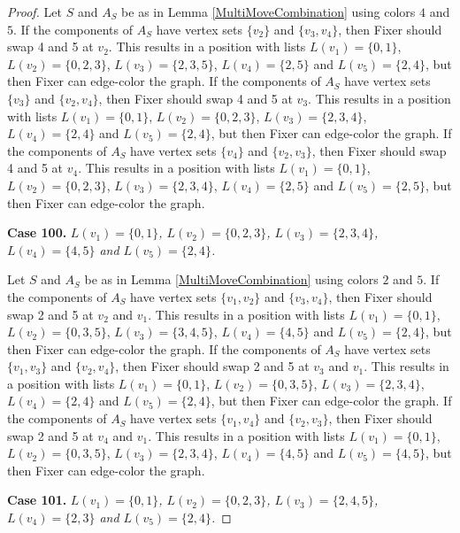 \documentclass[12pt]{amsart}
\theoremstyle{plain}
\theoremstyle{definition}
\theoremstyle{remark}
\begin{document}
\begin{proof}
Let $S$ and $A_S$ be as in Lemma \ref{MultiMoveCombination} using colors $4$ and $5$. If the components of $A_S$ have vertex sets $\{v_2\}$ and $\{v_3, v_4\}$, then Fixer should swap 4 and 5 at $v_2$. This results in a position with lists $L(v_1) = \{0, 1\}$, $L(v_2) = \{0, 2, 3\}$, $L(v_3) = \{2, 3, 5\}$, $L(v_4) = \{2, 5\}$ and $L(v_5) = \{2, 4\}$, but then Fixer can edge-color the graph.
If the components of $A_S$ have vertex sets $\{v_3\}$ and $\{v_2, v_4\}$, then Fixer should swap 4 and 5 at $v_3$. This results in a position with lists $L(v_1) = \{0, 1\}$, $L(v_2) = \{0, 2, 3\}$, $L(v_3) = \{2, 3, 4\}$, $L(v_4) = \{2, 4\}$ and $L(v_5) = \{2, 4\}$, but then Fixer can edge-color the graph.
If the components of $A_S$ have vertex sets $\{v_4\}$ and $\{v_2, v_3\}$, then Fixer should swap 4 and 5 at $v_4$. This results in a position with lists $L(v_1) = \{0, 1\}$, $L(v_2) = \{0, 2, 3\}$, $L(v_3) = \{2, 3, 4\}$, $L(v_4) = \{2, 5\}$ and $L(v_5) = \{2, 5\}$, but then Fixer can edge-color the graph.

\noindent\textbf{Case 100.  }\textit{$L(v_1) = \{0, 1\}$, $L(v_2) = \{0, 2, 3\}$, $L(v_3) = \{2, 3, 4\}$, $L(v_4) = \{4, 5\}$ and $L(v_5) = \{2, 4\}$.}

Let $S$ and $A_S$ be as in Lemma \ref{MultiMoveCombination} using colors $2$ and $5$. If the components of $A_S$ have vertex sets $\{v_1, v_2\}$ and $\{v_3, v_4\}$, then Fixer should swap 2 and 5 at $v_2$ and $v_1$. This results in a position with lists $L(v_1) = \{0, 1\}$, $L(v_2) = \{0, 3, 5\}$, $L(v_3) = \{3, 4, 5\}$, $L(v_4) = \{4, 5\}$ and $L(v_5) = \{2, 4\}$, but then Fixer can edge-color the graph.
If the components of $A_S$ have vertex sets $\{v_1, v_3\}$ and $\{v_2, v_4\}$, then Fixer should swap 2 and 5 at $v_3$ and $v_1$. This results in a position with lists $L(v_1) = \{0, 1\}$, $L(v_2) = \{0, 3, 5\}$, $L(v_3) = \{2, 3, 4\}$, $L(v_4) = \{2, 4\}$ and $L(v_5) = \{2, 4\}$, but then Fixer can edge-color the graph.
If the components of $A_S$ have vertex sets $\{v_1, v_4\}$ and $\{v_2, v_3\}$, then Fixer should swap 2 and 5 at $v_4$ and $v_1$. This results in a position with lists $L(v_1) = \{0, 1\}$, $L(v_2) = \{0, 3, 5\}$, $L(v_3) = \{2, 3, 4\}$, $L(v_4) = \{4, 5\}$ and $L(v_5) = \{4, 5\}$, but then Fixer can edge-color the graph.

\noindent\textbf{Case 101.  }\textit{$L(v_1) = \{0, 1\}$, $L(v_2) = \{0, 2, 3\}$, $L(v_3) = \{2, 4, 5\}$, $L(v_4) = \{2, 3\}$ and $L(v_5) = \{2, 4\}$.}


\end{proof}
\end{document}
